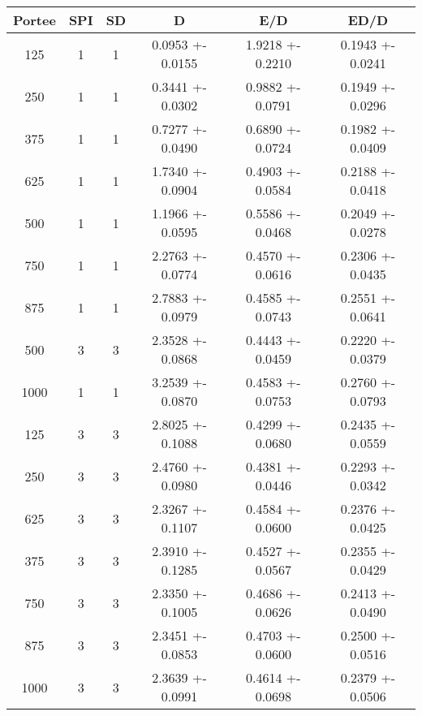 \documentclass[a4paper]{article}
\begin{document}
\begin{center}
\begin{tabular}{|c|c|c|c|c|c|}
  \hline
Portee & SPI & SD & D & E/D & ED/D \\\hline
125 & 1 & 1 & 0.0953 +- 0.0155 & 1.9218 +- 0.2210 & 0.1943 +- 0.0241 \\\hline
250 & 1 & 1 & 0.3441 +- 0.0302 & 0.9882 +- 0.0791 & 0.1949 +- 0.0296 \\\hline
375 & 1 & 1 & 0.7277 +- 0.0490 & 0.6890 +- 0.0724 & 0.1982 +- 0.0409 \\\hline
625 & 1 & 1 & 1.7340 +- 0.0904 & 0.4903 +- 0.0584 & 0.2188 +- 0.0418 \\\hline
500 & 1 & 1 & 1.1966 +- 0.0595 & 0.5586 +- 0.0468 & 0.2049 +- 0.0278 \\\hline
750 & 1 & 1 & 2.2763 +- 0.0774 & 0.4570 +- 0.0616 & 0.2306 +- 0.0435 \\\hline
875 & 1 & 1 & 2.7883 +- 0.0979 & 0.4585 +- 0.0743 & 0.2551 +- 0.0641 \\\hline
500 & 3 & 3 & 2.3528 +- 0.0868 & 0.4443 +- 0.0459 & 0.2220 +- 0.0379 \\\hline
1000 & 1 & 1 & 3.2539 +- 0.0870 & 0.4583 +- 0.0753 & 0.2760 +- 0.0793 \\\hline
125 & 3 & 3 & 2.8025 +- 0.1088 & 0.4299 +- 0.0680 & 0.2435 +- 0.0559 \\\hline
250 & 3 & 3 & 2.4760 +- 0.0980 & 0.4381 +- 0.0446 & 0.2293 +- 0.0342 \\\hline
625 & 3 & 3 & 2.3267 +- 0.1107 & 0.4584 +- 0.0600 & 0.2376 +- 0.0425 \\\hline
375 & 3 & 3 & 2.3910 +- 0.1285 & 0.4527 +- 0.0567 & 0.2355 +- 0.0429 \\\hline
750 & 3 & 3 & 2.3350 +- 0.1005 & 0.4686 +- 0.0626 & 0.2413 +- 0.0490 \\\hline
875 & 3 & 3 & 2.3451 +- 0.0853 & 0.4703 +- 0.0600 & 0.2500 +- 0.0516 \\\hline
1000 & 3 & 3 & 2.3639 +- 0.0991 & 0.4614 +- 0.0698 & 0.2379 +- 0.0506 \\\hline
\end{tabular}
\end{center}
\end{document}
